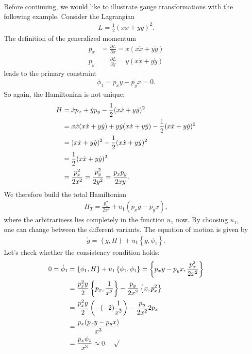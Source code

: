 Before continuing, we would like to illustrate gauge transformations with the following example.
Consider the Lagrangian
\begin{align}
L = \frac{1}{2} (x \dot{x} + y \dot{y})^2.
\end{align}
The definition of the generalized momentum 
\begin{align}
p_x &= \frac{\partial L}{\partial \dot{x}} =  x (x \dot{x} + y \dot{y}) \\
p_y &= \frac{\partial L}{\partial \dot{y}} = y (x \dot{x} + y \dot{y})
\end{align}
leads to the primary constraint
\begin{align}
\phi_1 = p_x y - p_y x = 0.
\end{align}
So again, the Hamiltonian is not unique:
\begin{align}
H &= \dot{x} p_x + \dot{y} p_y - \frac{1}{2} (x \dot{x} + y \dot{y})^2 \notag \\
&= x \dot{x} (x \dot{x} + y \dot{y}) + y \dot{y} (x \dot{x} + y \dot{y}) - \frac{1}{2} (x \dot{x} + y \dot{y})^2 \notag \\
&= (x \dot{x} + y \dot{y})^2 - \frac{1}{2} (x \dot{x} + y \dot{y})^2 \notag \\
&= \frac{1}{2} (x \dot{x} + y \dot{y})^2  \notag \\
&= \frac{p_x^2}{2 x^2} = \frac{p_y^2}{2 y^2} = \frac{p_x p_y}{2 x y}.
\end{align}
We therefore build the total Hamiltonian
\begin{align}
H_T = \frac{p_x^2}{2 x^2} + u_1 (p_x y - p_y x),
\end{align}
where the arbitrariness lies completely in the function $u_1$ now. By choosing $u_1$, one can change between the different variants. The equation of motion is given by
\begin{align}
\dot{g} = \left \{ g,H \right \} + u_1 \left \{ g,\phi_1 \right \}.
\end{align}
Let's check whether the consistency condition holds:
\begin{align}
0 = \dot{\phi}_1 &= \left \{ \phi_1,H \right \} + u_1 \left \{ \phi_1,\phi_1 \right \} = \left \{ p_x y - p_y x,\frac{p_x^2}{2 x^2} \right \} \notag \\
&= \frac{p_x^2 y}{2} \left \{ p_x,\frac{1}{x^2} \right \} - \frac{p_y}{2 x^2} \left \{ x,p_x^2 \right \} \notag \\
&= \frac{p_x^2 y}{2} \left(-(-2) \frac{1}{x^3}\right) - \frac{p_y}{2 x^2} 2 p_x \notag \\
&= \frac{p_x (p_x y - p_y x)}{x^3} \notag \\
&= \frac{p_x \phi_1}{x^3} \approx 0. \ \ \ \surd
\end{align}
